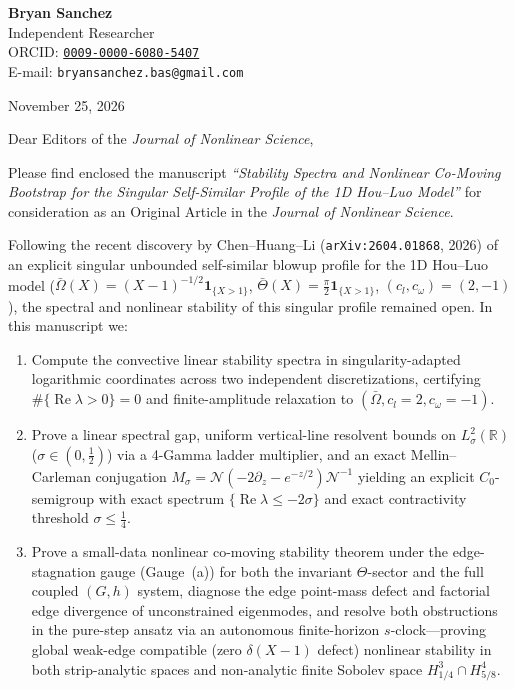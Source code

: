 \documentclass[10.5pt,letterpaper]{article}
\begin{document}
\textbf{Bryan Sanchez}\\
Independent Researcher\\
ORCID: \href{https://orcid.org/0009-0000-6080-5407}{\texttt{0009-0000-6080-5407}}\\
E-mail: \texttt{bryansanchez.bas@gmail.com}

\vspace{0.5em}
November 25, 2026

\vspace{0.5em}
Dear Editors of the \emph{Journal of Nonlinear Science},

Please find enclosed the manuscript \emph{``Stability Spectra and Nonlinear Co-Moving Bootstrap for the Singular Self-Similar Profile of the 1D Hou--Luo Model''} for consideration as an Original Article in the \emph{Journal of Nonlinear Science}.

Following the recent discovery by Chen--Huang--Li (\texttt{arXiv:2604.01868}, 2026) of an explicit singular unbounded self-similar blowup profile for the 1D Hou--Luo model ($\bar\Omega(X) = (X-1)^{-1/2}\mathbf{1}_{\{X>1\}}$, $\bar\Theta(X) = \frac{\pi}{2}\mathbf{1}_{\{X>1\}}$, $(c_l, c_\omega) = (2, -1)$), the spectral and nonlinear stability of this singular profile remained open. In this manuscript we:
\begin{enumerate}
  \item Compute the convective linear stability spectra in singularity-adapted logarithmic coordinates across two independent discretizations, certifying $\#\{\operatorname{Re}\lambda > 0\} = 0$ and finite-amplitude relaxation to $(\bar\Omega, c_l = 2, c_\omega = -1)$.
  \item Prove a linear spectral gap, uniform vertical-line resolvent bounds on $L^2_\sigma(\mathbb{R})$ ($\sigma \in (0, \frac{1}{2})$) via a 4-Gamma ladder multiplier, and an exact Mellin--Carleman conjugation $M_\sigma = \mathcal{N}(-2\partial_z - e^{-z/2})\mathcal{N}^{-1}$ yielding an explicit $C_0$-semigroup with exact spectrum $\{\operatorname{Re}\lambda \le -2\sigma\}$ and exact contractivity threshold $\sigma \le \frac{1}{4}$.
  \item Prove a small-data nonlinear co-moving stability theorem under the edge-stagnation gauge (Gauge~(a)) for both the invariant $\Theta$-sector and the full coupled $(G, h)$ system, diagnose the edge point-mass defect and factorial edge divergence of unconstrained eigenmodes, and resolve both obstructions in the pure-step ansatz via an autonomous finite-horizon $s$-clock—proving global weak-edge compatible (zero $\delta(X-1)$ defect) nonlinear stability in both strip-analytic spaces and non-analytic finite Sobolev space $H^3_{1/4} \cap H^4_{5/8}$.
\end{enumerate}
\end{document}
